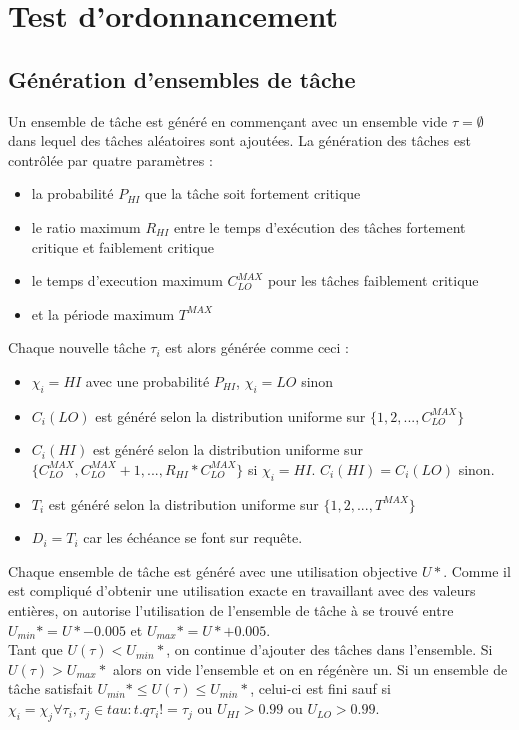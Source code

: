 \documentclass[12pt,a4paper,oneside]{book}
\theoremstyle{break}
\theoremstyle{breakplain}
\begin{document}
\chapter{Test d'ordonnancement}

\section{Génération d'ensembles de tâche}
Un ensemble de tâche est généré\cite{ekberg2014bounding} en commençant avec un ensemble vide $\tau = \emptyset$ dans lequel des tâches aléatoires sont ajoutées. La génération des tâches est contrôlée par quatre paramètres :
\begin{itemize}
\item la probabilité $P_{HI}$ que la tâche soit fortement critique
\item le ratio maximum $R_{HI}$ entre le temps d'exécution des tâches fortement critique et faiblement critique
\item le temps d'execution maximum $C^{MAX}_{LO}$ pour les tâches faiblement critique
\item et la période maximum $T^{MAX}$
\end{itemize}
Chaque nouvelle tâche $\tau_i$ est alors générée comme ceci :
\begin{itemize}
\item $\chi_i = HI$ avec une probabilité $P_{HI}$, $\chi_i = LO$ sinon
\item $C_i(LO)$ est généré selon la distribution uniforme sur $\{1,2,...,C^{MAX}_{LO}\}$
\item $C_i(HI)$ est généré selon la distribution uniforme sur $\{C^{MAX}_{LO},C^{MAX}_{LO}+1,...,R_{HI}*C^{MAX}_{LO}\}$ si $\chi_i = HI$. $C_i(HI) = C_i(LO)$ sinon.
\item $T_i$ est généré selon la distribution uniforme sur $\{1,2,...,T^{MAX}\}$
\item $D_i = T_i$ car les échéance se font sur requête.
\end{itemize}

Chaque ensemble de tâche est généré avec une utilisation objective $U*$. Comme il est compliqué d'obtenir une utilisation exacte en travaillant avec des valeurs entières, on autorise l'utilisation de l'ensemble de tâche à se trouvé entre $U_{min}* = U*-0.005$ et $U_{max}* = U*+0.005$.\\
Tant que $U(\tau) < U_{min}*$, on continue d'ajouter des tâches dans l'ensemble. Si $U(\tau) > U_{max}*$ alors on vide l'ensemble et on en régénère un. Si un ensemble de tâche satisfait $U_{min}* \leq U(\tau) \leq  U_{min}*$, celui-ci est fini sauf si $\chi_i = \chi_j \forall \tau_i,\tau_j \in tau : t.q \tau_i != \tau_j$ ou $U_{HI} > 0.99$ ou $U_{LO} > 0.99$.
\end{document}

